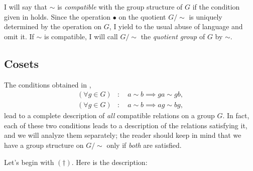 I will say that $\sim$ is \emph{compatible} with the group structure
of $G$ if the condition given in
 holds.
Since the operation $\bullet$ on the quotient $G/\!\sim$ is uniquely
determined by the operation on $G$, I yield to the usual abuse of
language and omit it. If $\sim$ is compatible, I will call $G/\!\sim$
the \emph{quotient group} of $G$ by $\sim$.

\subsection{Cosets}
\label{subsec:groups:cosets}
The conditions obtained in
,
\begin{align}
  \tag{$\dagger$} (\forall g \in G) &: \quad a \sim b \implies ga \sim gb, \\
  \tag{$\dagger\dagger$} (\forall g \in G) &: \quad a \sim b \implies ag \sim bg,
\end{align}
lead to a complete description of \emph{all} compatible relations on a
group $G$. In fact, each of these two conditions leads to a
description of the relations satisfying it, and we will analyze them
separately; the reader should keep in mind that we have a group
structure on $G/\!\sim$ only if \emph{both} are satisfied.

Let's begin with $(\dagger)$. Here is the description:

